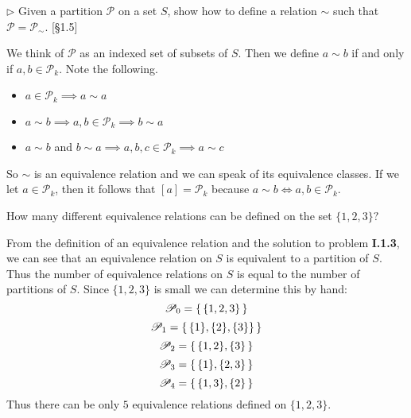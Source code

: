 \begin{problem}
  $\rhd$ Given a partition $\mathscr{P}$ on a set $S$, show how to define a
  relation $\sim$ such that $\mathscr{P} = \mathscr{P}_{\sim}$. [\S1.5]
\end{problem}

\begin{solution}
We think of $\mathscr{P}$ as an indexed set of subsets of $S$. Then we define
$a \sim b$ if and only if $a,b \in \mathscr{P}_k$. Note the following.

\begin{itemize}
    \item $a \in \mathscr{P}_k \implies a \sim a$
    \item $a \sim b \implies a,b \in \mathscr{P}_k \implies b \sim a$
    \item $a \sim b$ and $b \sim a \implies a,b,c \in \mathscr{P}_k \implies a \sim c$
\end{itemize}

So $\sim$ is an equivalence relation and we can speak of its equivalence
classes. If we let $a \in \mathscr{P}_k$, then it follows that $[a] =
\mathscr{P}_k$ because $a \sim b \iff a,b \in \mathscr{P}_k$.
\end{solution}


\begin{problem}
  How many different equivalence relations can be defined on the set
  $\{1,2,3\}?$
\end{problem}
\begin{solution}
  From the definition of an equivalence relation and the solution to problem
  \textbf{I.1.3}, we can see that an equivalence relation on $S$ is equivalent
  to a partition of $S$. Thus the number of equivalence relations on $S$ is
  equal to the number of partitions of $S$. Since $\{1,2,3\}$ is small we can determine this by hand:
  \[ \mathscr{P}_0 = \left\{\,\{1,2,3\}\,\right\} \]
  \[ \mathscr{P}_1 = \left\{\,\{1\},\{2\},\{3\}\}\,\right\} \]
  \[ \mathscr{P}_2 = \left\{\,\{1,2\},\{3\}\,\right\} \]
  \[ \mathscr{P}_3 = \left\{\,\{1\},\{2,3\}\,\right\} \]
  \[ \mathscr{P}_4 = \left\{\,\{1,3\},\{2\}\,\right\} \]
  Thus there can be only $5$ equivalence relations defined on $\{1,2,3\}$.
\end{solution}

